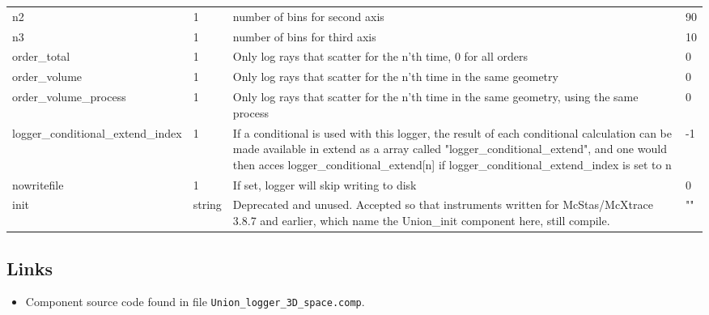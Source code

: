 \begin{longtable}{p{}p{}p{}p{}}
n2 & 1 & number of bins for second axis & 90 \\
n3 & 1 & number of bins for third axis & 10 \\
order\_total & 1 & Only log rays that scatter for the n'th time, 0 for all orders & 0 \\
order\_volume & 1 & Only log rays that scatter for the n'th time in the same geometry & 0 \\
order\_volume\_process & 1 & Only log rays that scatter for the n'th time in the same geometry, using the same process & 0 \\
logger\_conditional\_extend\_index & 1 & If a conditional is used with this logger, the result of each conditional calculation can be made available in extend as a array called "logger\_conditional\_extend", and one would then acces logger\_conditional\_extend[n] if logger\_conditional\_extend\_index is set to n & -1 \\
nowritefile & 1 & If set, logger will skip writing to disk & 0 \\
init & string & Deprecated and unused. Accepted so that instruments written for McStas/McXtrace 3.8.7 and earlier, which name the Union\_init component here, still compile. & "" \\
\bottomrule
\end{longtable}

\subsection*{Links}
\begin{itemize}
  \item Component source code found in file \texttt{Union\_logger\_3D\_space.comp}.
\end{itemize}
